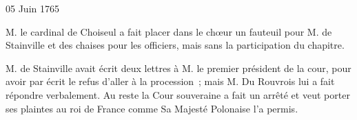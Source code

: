 \begin{diary}{05 Juin 1765}{}
        
                        
                           M. le cardinal de Choiseul a fait
                           placer dans le
                           chœur un fauteuil pour M. de
                              Stainville et des
                           chaises pour les officiers, mais sans la participation
                           du chapitre. \bigskip
        
        
                        
                        
                        
                           M. de Stainville avait écrit
                           deux lettres à M.
                              le premier président de la cour, pour avoir par écrit
                           le refus d'aller à la procession ; mais M.
                              Du Rouvrois
                           lui a fait répondre verbalement. Au reste la
                              Cour souveraine a fait un arrêté et veut porter ses
                           plaintes au roi de France comme Sa Majesté Polonaise l'a permis. \bigskip
        
        
                     \end{diary}

